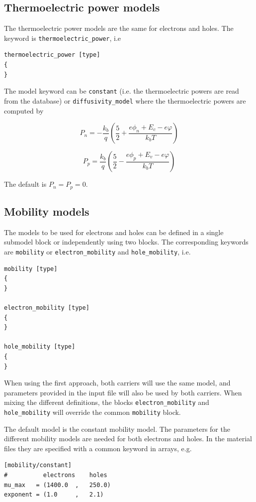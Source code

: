 \subsection{Thermoelectric power models}


The thermoelectric power models are the same for electrons and holes.
The keyword is \texttt{thermoelectric\_power}, i.e
\begin{verbatim}
thermoelectric_power [type]
{
}

\end{verbatim}
The model keyword can be \texttt{constant} (i.e. the thermoelectric powers are read from the database) or
\texttt{diffusivity\_model} where the thermoelectric powers are computed by

\begin{equation}
P_n = - \frac{k_b}{q}\left( \frac{5}{2} + \frac{e \phi_n + E_c - e \varphi}{k_b T} \right)
\end{equation}

\begin{equation}
P_p = \frac{k_b}{q}\left( \frac{5}{2} - \frac{e \phi_p + E_v - e \varphi}{k_b T} \right)
\end{equation}

The default is $P_n = P_p = 0$.


\subsection{Mobility models}

\label{dd:mobility_models}

The models to be used for electrons and holes can be defined in a single submodel
block or independently using two blocks.
The corresponding keywords are \texttt{mobility} or \texttt{electron\_mobility} and \texttt{hole\_mobility}, i.e.

\begin{verbatim}
mobility [type]
{
}

electron_mobility [type]
{
}

hole_mobility [type]
{
}
\end{verbatim}

When using the first approach, both carriers will use the same model, and parameters
provided in the input file will also be used by both carriers.
When mixing the different definitions, the blocks \texttt{electron\_mobility} and \texttt{hole\_mobility} will override the common \texttt{mobility} block.

The default model is the constant mobility model.
The parameters for the different mobility models are needed for both electrons and holes.
In the material files they are specified with a common keyword in arrays, e.g.
\begin{verbatim}
[mobility/constant]
#          electrons    holes
mu_max   = (1400.0  ,   250.0)
exponent = (1.0     ,   2.1)
\end{verbatim}

